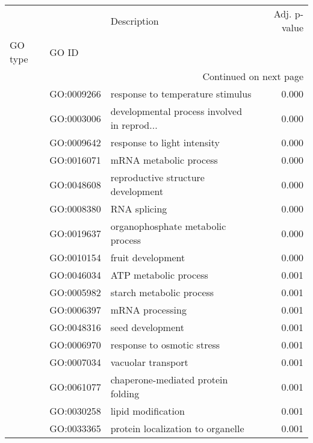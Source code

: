 \begin{longtable}{lllr}
\toprule
   &            &                                  Description &  Adj. p-value \\
GO type & GO ID &                                              &               \\
\midrule
\endhead
\midrule
\multicolumn{4}{r}{{Continued on next page}} \\
\midrule
\endfoot

\bottomrule
\endlastfoot
\multirow{177}{*}{BP} & GO:0009266 &             response to temperature stimulus &         0.000 \\
   & GO:0003006 &  developmental process involved in reprod... &         0.000 \\
   & GO:0009642 &                  response to light intensity &         0.000 \\
   & GO:0016071 &                       mRNA metabolic process &         0.000 \\
   & GO:0048608 &           reproductive structure development &         0.000 \\
   & GO:0008380 &                                 RNA splicing &         0.000 \\
   & GO:0019637 &            organophosphate metabolic process &         0.000 \\
   & GO:0010154 &                            fruit development &         0.000 \\
   & GO:0046034 &                        ATP metabolic process &         0.001 \\
   & GO:0005982 &                     starch metabolic process &         0.001 \\
   & GO:0006397 &                              mRNA processing &         0.001 \\
   & GO:0048316 &                             seed development &         0.001 \\
   & GO:0006970 &                   response to osmotic stress &         0.001 \\
   & GO:0007034 &                           vacuolar transport &         0.001 \\
   & GO:0061077 &           chaperone-mediated protein folding &         0.001 \\
   & GO:0030258 &                           lipid modification &         0.001 \\
   & GO:0033365 &            protein localization to organelle &         0.001 \\

\end{longtable}
